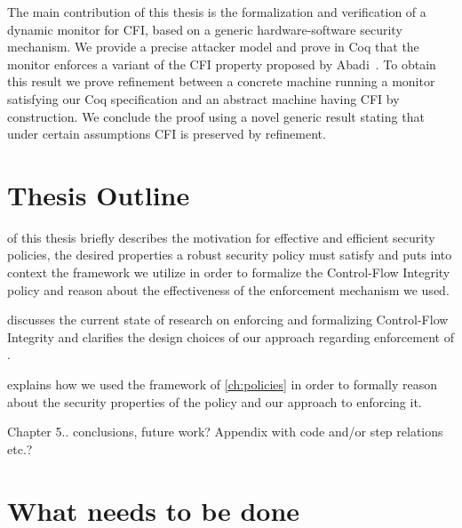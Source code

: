 The main contribution of this thesis is the formalization and
verification of a dynamic monitor for CFI, based on a generic
hardware-software security mechanism.
%
We provide a precise attacker model and prove in Coq that the monitor
enforces a variant of the CFI property proposed by
Abadi~\ETAL\cite{AbadiBEL09}.
%
To obtain this result we prove refinement between a concrete
machine running a monitor satisfying our Coq specification
and an abstract machine having CFI by construction.
%
We conclude the proof using a novel generic result stating that under
certain assumptions CFI is preserved by refinement.

\section{Thesis Outline}\label{sec:outline}
 of this thesis briefly describes the motivation for
effective and efficient security policies, the desired properties a
robust security policy must satisfy and puts into context the
framework we utilize in order to formalize the Control-Flow Integrity policy
and reason about the effectiveness of the enforcement mechanism we used.

 discusses the current state of
research on enforcing and formalizing Control-Flow Integrity and clarifies
the design choices of our approach regarding enforcement of \CFI.

 explains how we used the framework of \cref{ch:policies}
in order to formally reason about the security properties of the \CFI policy and
our approach to enforcing it. 

Chapter 5.. conclusions, future work? Appendix with code and/or step
relations etc.?

\section{What needs to be done}

